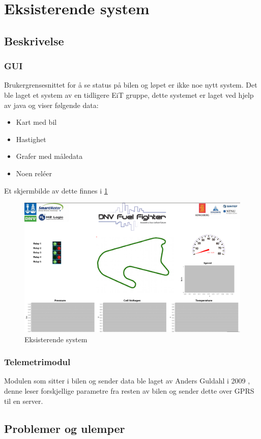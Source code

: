 \section{Eksisterende system}
\subsection{Beskrivelse}
\subsubsection{GUI}
Brukergrensesnittet for å se status på bilen og løpet er ikke noe nytt system. 
Det ble laget et system av en tidligere EiT gruppe, dette systemet er laget ved hjelp av java og viser følgende data:
\begin{itemize}
\item Kart med bil
\item Hastighet
\item Grafer med måledata
\item Noen reléer
\end{itemize}
Et skjermbilde av dette finnes i \ref{ekssys}
\\
\begin{figure}[H]
\caption{Eksisterende system} 
\label{ekssys}
\includegraphics[width=\textwidth]{images/java.png}
\end{figure}
\subsubsection{Telemetrimodul}
Modulen som sitter i bilen og sender data ble laget av Anders Guldahl i 2009 \cite{telemetrithesis}, denne leser forskjellige parametre fra resten av bilen og sender dette over GPRS til en server.
\subsection{Problemer og ulemper}
